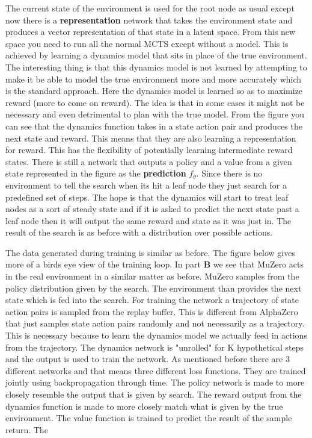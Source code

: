 The current state of the environment is used for the root node as usual except now there is a \textbf{representation} network that takes the environment state and produces a vector representation of that state in a latent space. From this new space you need to run all the normal MCTS except without a model. This is achieved by learning a dynamics model that sits in place of the true environment. The interesting thing is that this dynamics model is not learned by attempting to make it be able to model the true environment more and more accurately which is the standard approach. Here the dynamics model is learned so as to maximize reward (more to come on reward). The idea is that in some cases it might not be necessary and even detrimental to plan with the true model. From the figure you can see that the dynamics function takes in a state action pair and produces the next state and reward. This means that they are also learning a representation for reward. This has the flexibility of potentially learning intermediate reward states. There is still a network that outputs a policy and a value from a given state represented in the figure as the \textbf{prediction} $f_\theta$. Since there is no environment to tell the search when its hit a leaf node they just search for a predefined set of steps. The hope is that the dynamics will start to treat leaf nodes as a sort of steady state and if it is asked to predict the next state past a leaf node then it will output the same reward and state as it was just in. The result of the search is as before with a distribution over possible actions. 

The data generated during training is similar as before. The figure below gives more of a birds eye view of the training loop. In part \textbf{B} we see that MuZero acts in the real environment in a similar matter as before. MuZero samples from the policy distribution given by the search. The environment than provides the next state which is fed into the search. For training the network a trajectory of state action pairs is sampled from the replay buffer. This is different from AlphaZero that just samples state action pairs randomly and not necessarily as a trajectory. This is necessary because to learn the dynamics model we actually feed in actions from the trajectory. The dynamics network is "unrolled" for K hypothetical steps and the output is used to train the network. As mentioned before there are 3 different networks and that means three different loss functions. They are trained jointly using backpropagation through time. The policy network is made to more closely resemble the output that is given by search. The reward output from the dynamics function is made to more closely match what is given by the true environment. The value function is trained to predict the result of the sample return. The

